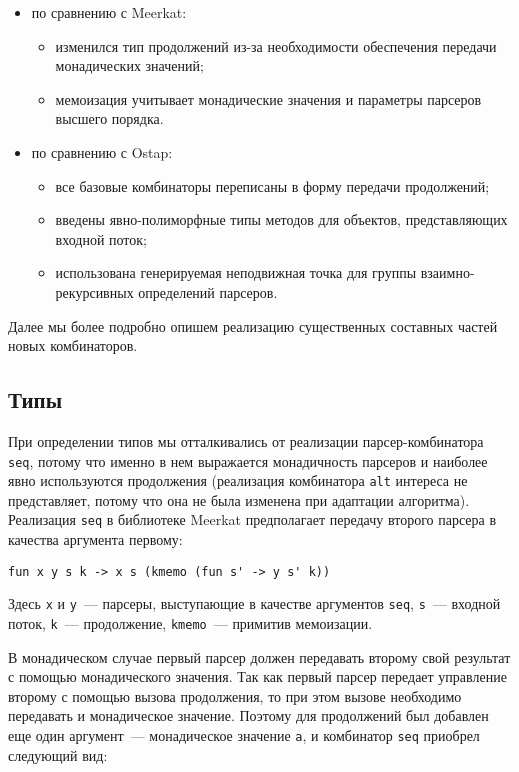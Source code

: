 \documentclass[conference]{IEEEtran}
\begin{document}
\begin{itemize}
\item по сравнению с Meerkat:

\begin{itemize}
\item изменился тип продолжений из-за необходимости обеспечения передачи монадических значений;
\item мемоизация учитывает монадические значения и параметры парсеров высшего порядка.
\end{itemize}

\item по сравнению с Ostap:

\begin{itemize}
\item все базовые комбинаторы переписаны в форму передачи продолжений;
\item введены явно-полиморфные типы методов для объектов, представляющих входной поток;
\item использована генерируемая неподвижная точка для группы взаимно-рекурсивных определений парсеров.
\end{itemize}
\end{itemize}

Далее мы более подробно опишем реализацию существенных составных частей новых комбинаторов.

\subsection{Типы}

При определении типов мы отталкивались от реализации парсер-комбинатора \lstinline|seq|, потому что именно в нем выражается монадичность парсеров и наиболее явно используются продолжения
(реализация комбинатора \lstinline|alt| интереса не представляет, потому что она не была изменена при адаптации алгоритма). Реализация \lstinline|seq| в библиотеке Meerkat
предполагает передачу второго парсера в качества аргумента первому:

\begin{lstlisting}[basicstyle=\small]
   fun x y s k -> x s (kmemo (fun s' -> y s' k))
\end{lstlisting}

Здесь \lstinline|x| и \lstinline|y|~--- парсеры, выступающие в качестве аргументов \lstinline|seq|, \lstinline|s|~--- входной поток, \lstinline|k|~--- продолжение,
\lstinline|kmemo|~--- примитив мемоизации.

В монадическом случае первый парсер должен передавать второму свой результат с помощью монадического значения. Так как первый парсер передает управление второму с
помощью вызова продолжения, то при этом вызове необходимо передавать и монадическое значение. Поэтому для продолжений был добавлен еще один аргумент~--- монадическое
значение \lstinline|a|, и комбинатор \lstinline|seq| приобрел следующий вид:
\end{document}
